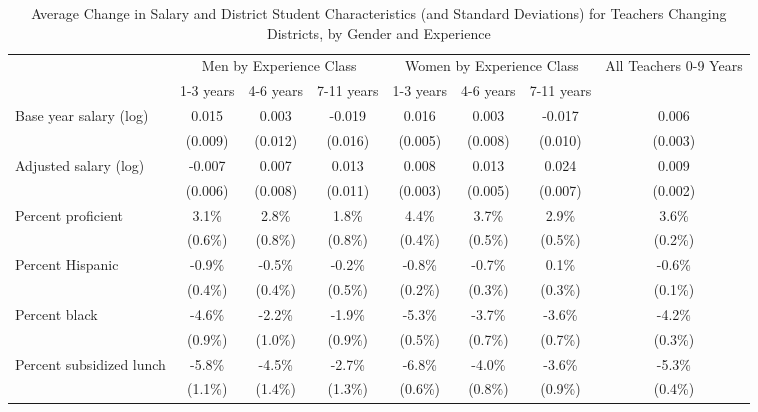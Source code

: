 \documentclass[]{article}
\begin{document}
\begin{sidewaystable}[ht]
\centering
\begin{tabular}{lccccccc}
  \hline
 & \multicolumn{3}{c}{Men by Experience Class} & \multicolumn{3}{c}{Women by Experience Class} & \multirow{2}{*}{\parbox{0.16\linewidth}{All Teachers 0-9 Years}}\\ \cline{2-4} \cline{5-7}
 & 1-3 years & 4-6 years & 7-11 years & 1-3 years & 4-6 years & 7-11 years &  \\ 
  \hline
Base year salary (log) & 0.015 & 0.003 & -0.019 & 0.016 & 0.003 & -0.017 & 0.006 \\ 
   & (0.009) & (0.012) & (0.016) & (0.005) & (0.008) & (0.010) & (0.003) \\ 
  Adjusted salary (log) & -0.007 & 0.007 & 0.013 & 0.008 & 0.013 & 0.024 & 0.009 \\ 
   & (0.006) & (0.008) & (0.011) & (0.003) & (0.005) & (0.007) & (0.002) \\ 
  Percent proficient & 3.1\% & 2.8\% & 1.8\% & 4.4\% & 3.7\% & 2.9\% & 3.6\% \\ 
   & (0.6\%) & (0.8\%) & (0.8\%) & (0.4\%) & (0.5\%) & (0.5\%) & (0.2\%) \\ 
  Percent Hispanic & -0.9\% & -0.5\% & -0.2\% & -0.8\% & -0.7\% & 0.1\% & -0.6\% \\ 
   & (0.4\%) & (0.4\%) & (0.5\%) & (0.2\%) & (0.3\%) & (0.3\%) & (0.1\%) \\ 
  Percent black & -4.6\% & -2.2\% & -1.9\% & -5.3\% & -3.7\% & -3.6\% & -4.2\% \\ 
   & (0.9\%) & (1.0\%) & (0.9\%) & (0.5\%) & (0.7\%) & (0.7\%) & (0.3\%) \\ 
  Percent subsidized lunch & -5.8\% & -4.5\% & -2.7\% & -6.8\% & -4.0\% & -3.6\% & -5.3\% \\ 
   & (1.1\%) & (1.4\%) & (1.3\%) & (0.6\%) & (0.8\%) & (0.9\%) & (0.4\%) \\ 
   \hline
\end{tabular}
\caption{Average Change in Salary and District Student Characteristics (and Standard Deviations) for Teachers Changing Districts, by Gender and Experience} 
\label{tbl:change_by_ge}
\end{sidewaystable}
\end{document}
